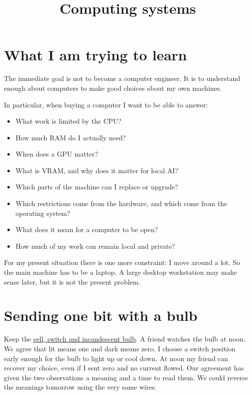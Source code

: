 



\title{Computing systems}
\maketitle

\section{What I am trying to learn}
\label{section-computing-systems-goal}

The immediate goal is not to become a
computer engineer.  It is to understand
enough about computers to make good
choices about my own machines.

In particular, when buying a computer I
want to be able to answer:

\begin{itemize}
\item What work is limited by the CPU?
\item How much RAM do I actually need?
\item When does a GPU matter?
\item What is VRAM, and why does it matter
for local AI?
\item Which parts of the machine can I
replace or upgrade?
\item Which restrictions come from the
hardware, and which come from the
operating system?
\item What does it mean for a computer to
be open?
\item How much of my work can remain local
and private?
\end{itemize}

For my present situation there is one more
constraint: I move around a lot.  So the
main machine has to be a laptop.  A large
desktop workstation may make sense later,
but it is not the present problem.

\section{Sending one bit with a bulb}
\label{section-bulb-bit}

Keep the
\href{https://www.heap-project.org/tag/0HHL}
{cell, switch and incandescent bulb}.
A friend watches the bulb at noon. We agree
that lit means one and dark means zero. I
choose a switch position early enough for the
bulb to light up or cool down. At noon my
friend can recover my choice, even if I sent
zero and no current flowed. Our agreement has
given the two observations a meaning and a
time to read them. We could reverse the
meanings tomorrow using the very same wires.

